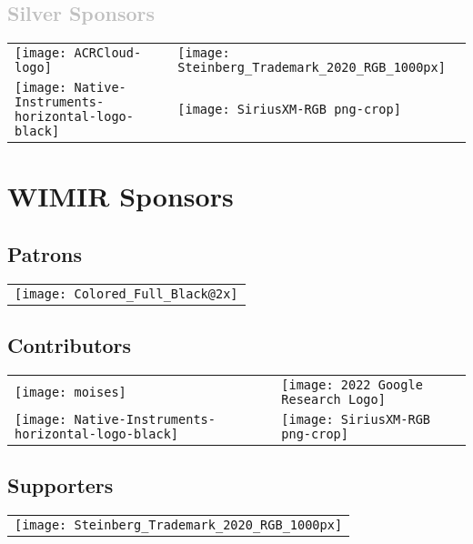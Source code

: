 \vfill

\subsection*{\textcolor{silver}{Silver Sponsors}}
\begin{tabularx}{\textwidth} { 
 >{\raggedleft\arraybackslash}X 
 >{\raggedright\arraybackslash}X
}
\texttt{[image: ACRCloud-logo]} &
\texttt{[image: Steinberg\_Trademark\_2020\_RGB\_1000px]} \\

\texttt{[image: Native-Instruments-horizontal-logo-black]} &
\texttt{[image: SiriusXM-RGB png-crop]} \\
\end{tabularx}

\vfill

\clearpage



\section*{\textbf{WIMIR Sponsors}}

\vfill

\subsection*{Patrons}
\begin{tabularx}{\textwidth} { 
 >{\centering\arraybackslash}X
}
\texttt{[image: Colored\_Full\_Black@2x]}
\\
\end{tabularx}

\vfill

\subsection*{Contributors}
\begin{tabularx}{\textwidth} { 
 >{\raggedleft\arraybackslash}X 
 >{\raggedright\arraybackslash}X
}
\texttt{[image: moises]} &
\texttt{[image: 2022 Google Research Logo]} \\

\texttt{[image: Native-Instruments-horizontal-logo-black]} &
\texttt{[image: SiriusXM-RGB png-crop]} \\
\end{tabularx}

\vfill

\subsection*{Supporters}
\begin{tabularx}{\textwidth} { 
 >{\centering\arraybackslash}X 
}
\texttt{[image: Steinberg\_Trademark\_2020\_RGB\_1000px]} \\
\end{tabularx}

\vfill

\endgroup

